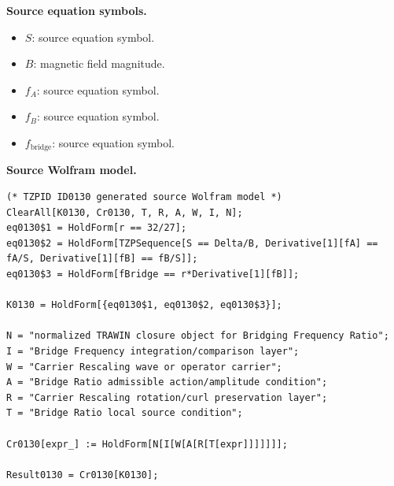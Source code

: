 \begin{minipage}[t]{0.49\linewidth}
\begingroup
\small
\raggedright
\textbf{Source equation symbols.}\par
\begin{itemize}[leftmargin=1.35em,itemsep=1pt,topsep=1pt,parsep=0pt]
    \item $S$: source equation symbol.
    \item $B$: magnetic field magnitude.
    \item $f_A$: source equation symbol.
    \item $f_B$: source equation symbol.
    \item $f_{\mathrm{bridge}}$: source equation symbol.
\end{itemize}
\endgroup
\end{minipage}\hfill
\begin{minipage}[t]{0.47\linewidth}
\begingroup
\scriptsize
\raggedright
\textbf{Source Wolfram model.}\par
\begin{Verbatim}[fontsize=\tiny,breaklines=true,breakanywhere=true]
(* TZPID ID0130 generated source Wolfram model *)
ClearAll[K0130, Cr0130, T, R, A, W, I, N];
eq0130$1 = HoldForm[r == 32/27];
eq0130$2 = HoldForm[TZPSequence[S == Delta/B, Derivative[1][fA] == fA/S, Derivative[1][fB] == fB/S]];
eq0130$3 = HoldForm[fBridge == r*Derivative[1][fB]];

K0130 = HoldForm[{eq0130$1, eq0130$2, eq0130$3}];

N = "normalized TRAWIN closure object for Bridging Frequency Ratio";
I = "Bridge Frequency integration/comparison layer";
W = "Carrier Rescaling wave or operator carrier";
A = "Bridge Ratio admissible action/amplitude condition";
R = "Carrier Rescaling rotation/curl preservation layer";
T = "Bridge Ratio local source condition";

Cr0130[expr_] := HoldForm[N[I[W[A[R[T[expr]]]]]]];

Result0130 = Cr0130[K0130];
\end{Verbatim}
\endgroup
\end{minipage}

